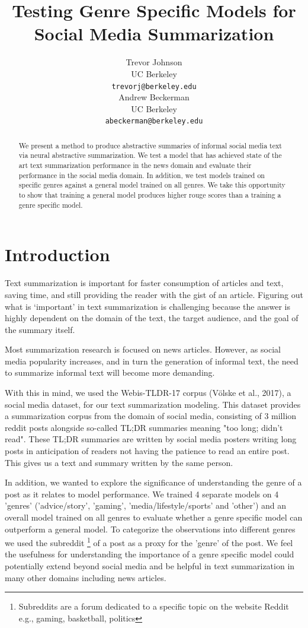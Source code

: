\documentclass[11pt,a4paper, twocolumn]{article}
\title{Testing Genre Specific Models for Social Media Summarization}
\author{Trevor Johnson \\
  UC Berkeley  \\
  \texttt{trevorj@berkeley.edu} \\\And
  Andrew Beckerman \\
  UC Berkeley \\
  \texttt{abeckerman@berkeley.edu} \\}
\date{}
\begin{document}
\maketitle
\begin{abstract}

We present a method to produce abstractive summaries of informal social media text via neural abstractive summarization. We test a model that has achieved state of the art text summarization performance in the news domain and evaluate their performance in the social media domain.
In addition, we test models trained on specific genres against a general model trained on all genres. We take this opportunity to show that training a general model produces higher rouge scores than a training a genre specific model.

\end{abstract}

\section{Introduction}

Text summarization is important for faster consumption of articles and text, saving time, and still providing the reader with the gist of an article. Figuring out what is ‘important’ in text summarization is challenging because the answer is highly dependent on the domain of the text, the target audience, and the goal of the summary itself.

Most summarization research is focused on news articles. However, as social media popularity increases, and in turn the generation of informal text, the need to summarize informal text will become more demanding.

With this in mind, we used the Webis-TLDR-17 corpus (Völske et al., 2017), a social media dataset, for our text summarization modeling. This dataset provides a summarization corpus from the domain of social media, consisting of 3 million reddit posts alongside so-called TL;DR summaries meaning "too long; didn't read".  These TL;DR summaries are written by social media posters writing long posts in anticipation of readers not having the patience to read an entire post. This gives us a text and summary written by the same person.

In addition, we wanted to explore the significance of understanding the genre of a post as it relates to model performance. We trained 4 separate models on 4 'genres' ('advice/story', 'gaming', 'media/lifestyle/sports' and 'other') and an overall model trained on all genres to evaluate whether a genre specific model can outperform a general model. To categorize the observations into different genres we used the subreddit \footnote{Subreddits are a forum dedicated to a specific topic on the website Reddit e.g., gaming, basketball, politics} of a post as a proxy for the 'genre' of the post. We feel the usefulness for understanding the importance of a genre specific model could potentially extend beyond social media and be helpful in text summarization in many other domains including news articles.
\end{document}
